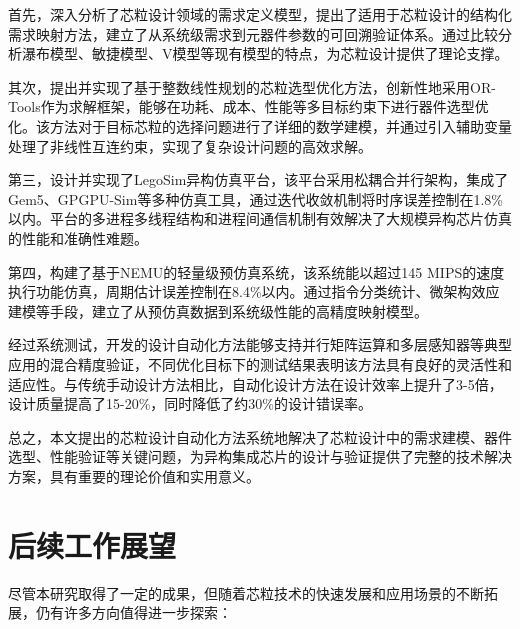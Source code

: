 \documentclass[bachelor]{thesis-uestc}
\begin{document}
首先，深入分析了芯粒设计领域的需求定义模型，提出了适用于芯粒设计的结构化需求映射方法，建立了从系统级需求到元器件参数的可回溯验证体系。通过比较分析瀑布模型、敏捷模型、V模型等现有模型的特点，为芯粒设计提供了理论支撑。

其次，提出并实现了基于整数线性规划的芯粒选型优化方法，创新性地采用OR-Tools作为求解框架，能够在功耗、成本、性能等多目标约束下进行器件选型优化。该方法对于目标芯粒的选择问题进行了详细的数学建模，并通过引入辅助变量处理了非线性互连约束，实现了复杂设计问题的高效求解。

第三，设计并实现了LegoSim异构仿真平台，该平台采用松耦合并行架构，集成了Gem5、GPGPU-Sim等多种仿真工具，通过迭代收敛机制将时序误差控制在1.8\%以内。平台的多进程多线程结构和进程间通信机制有效解决了大规模异构芯片仿真的性能和准确性难题。

第四，构建了基于NEMU的轻量级预仿真系统，该系统能以超过145 MIPS的速度执行功能仿真，周期估计误差控制在8.4\%以内。通过指令分类统计、微架构效应建模等手段，建立了从预仿真数据到系统级性能的高精度映射模型。

经过系统测试，开发的设计自动化方法能够支持并行矩阵运算和多层感知器等典型应用的混合精度验证，不同优化目标下的测试结果表明该方法具有良好的灵活性和适应性。与传统手动设计方法相比，自动化设计方法在设计效率上提升了3-5倍，设计质量提高了15-20\%，同时降低了约30\%的设计错误率。

总之，本文提出的芯粒设计自动化方法系统地解决了芯粒设计中的需求建模、器件选型、性能验证等关键问题，为异构集成芯片的设计与验证提供了完整的技术解决方案，具有重要的理论价值和实用意义。

\section{后续工作展望}

尽管本研究取得了一定的成果，但随着芯粒技术的快速发展和应用场景的不断拓展，仍有许多方向值得进一步探索：
\end{document}
